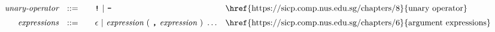 \begin{alignat*}{9}
&& \textit{unary-operator}    
                        && ::= &\quad && \textbf{\texttt{!}}\ |\ \textbf{\texttt{-}}
                        && \textrm{\href{https://sicp.comp.nus.edu.sg/chapters/8}{unary operator}}\\[1mm]
&& \textit{expressions}  && ::= &\quad && \epsilon\ | \ \textit{expression}\ (
                                                               \ \textbf{\texttt{,}} \
                                                                 \textit{expression} \ 
                                                                      )\ \ldots
                                                            && \textrm{\href{https://sicp.comp.nus.edu.sg/chapters/6}{argument expressions}} 
\end{alignat*}
